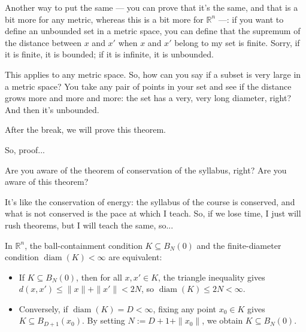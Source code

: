 \begin{speech}[00:43:13 - 00:44:52]
Another way to put the same --- you can prove that it's the same, and that is a bit more for any metric, whereas this is a bit more for $\mathbb{R}^n$ ---: if you want to define an unbounded set in a metric space, you can define that the supremum of the distance between $x$ and $x'$  when $x$ and $x'$ belong to my set  is finite. Sorry, if it is finite, it is bounded; if it is infinite, it is unbounded.

This applies to any metric space. So, how can you say if a subset is very large in a metric space? You take any pair of points in your set and see if the distance grows more and more and more: the set has a very, very long diameter, right? And then it's unbounded.

After the break, we will prove this theorem. 

So, proof...

Are you aware of the theorem of conservation of the syllabus, right? Are you aware of this theorem?

It's like the conservation of energy: the syllabus of the course is conserved, and what is not conserved is the pace at which I teach. So, if we lose time, I just will rush theorems, but I will teach the same, so...
\end{speech}

\begin{content}

\begin{steps}
In $\mathbb{R}^n$, the ball-containment condition $K \subseteq B_N(0)$ and the finite-diameter condition $\operatorname{diam}(K) < \infty$ are equivalent:
\begin{itemize}
    \item If $K \subseteq B_N(0)$, then for all $x, x' \in K$, the triangle inequality gives $d(x, x') \le \|x\| + \|x'\| < 2N$, so $\operatorname{diam}(K) \le 2N < \infty$.
    \item Conversely, if $\operatorname{diam}(K) = D < \infty$, fixing any point $x_0 \in K$ gives $K \subseteq B_{D+1}(x_0)$. By setting $N := D + 1 + \|x_0\|$, we obtain $K \subseteq B_N(0)$.
\end{itemize}
\end{steps}
\end{content}

